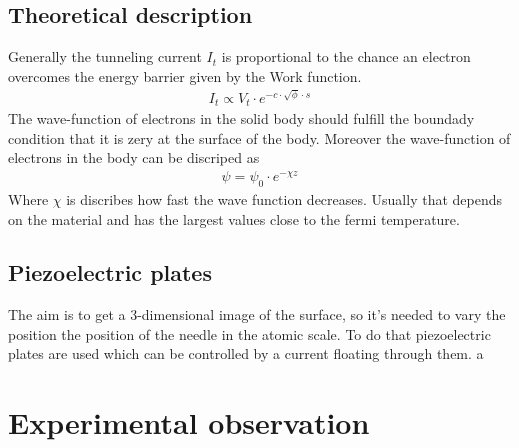 \message{ !name(stm.tex)}\documentclass[a4paper, parskip=half]{scrartcl}
\begin{document}
\subsection{Theoretical description}
Generally the tunneling current $I_t$ is proportional to the chance an electron overcomes the energy barrier given by the Work function.
\begin{align}
  I_t \propto V_t \cdot e^{-c \cdot \sqrt{\phi} \cdot s}
\end{align}
The wave-function of electrons in the solid body should fulfill the boundady condition that it is zery at the surface of the body. Moreover the wave-function of electrons in the body can be discriped as
\begin{align}
\psi = \psi_0 \cdot e^{-\chi z}
\end{align}
Where $\chi$ is discribes how fast the wave function decreases. Usually that depends on the material and has the largest values close to the fermi temperature. 

\subsection{Piezoelectric plates}
The aim is to get a 3-dimensional image of the surface, so it's needed to vary the position the position of the needle in the atomic scale. To do that piezoelectric plates are used which can be controlled by a current floating through them. a


\section{Experimental observation}
    
\begin{thebibliography}{999}

\end{thebibliography}
\end{document}
